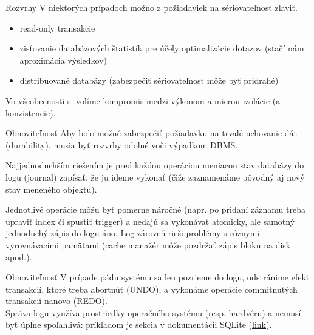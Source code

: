 \documentclass[12pt]{beamer}
\begin{document}
\begin{frame}[fragile]{Rozvrhy}
V niektorých prípadoch možno z požiadaviek na sériovateľnosť zľaviť.
\begin{itemize}
\item read-only transakcie
\item zisťovanie databázových štatistík pre účely optimalizácie dotazov (stačí nám aproximácia výsledkov)
\item distribuované databázy (zabezpečiť sériovateľnosť môže byť pridrahé)
\end{itemize}
Vo všeobecnosti si volíme kompromis medzi výkonom a mierou izolácie (a konzistencie).
\end{frame}


\begin{frame}[fragile]{Obnoviteľnosť}
Aby bolo možné zabezpečiť požiadavku na trvalé uchovanie dát (durability), musia byť rozvrhy odolné voči výpadkom DBMS.

Najjednoduchším riešením je pred každou operáciou meniacou stav databázy do logu (journal) zapísať,
že ju ideme vykonať (čiže zaznamenáme pôvodný aj nový stav meneného objektu).

Jednotlivé operácie môžu byť pomerne náročné (napr. po pridaní záznamu treba upraviť index či spustiť trigger)
a nedajú sa vykonávať atomicky, ale samotný jednoduchý zápis do logu áno.
Log zároveň rieši problémy s rôznymi vyrovnávacími pamäťami (cache manažér môže pozdržať zápis bloku na disk apod.).
\end{frame}


\begin{frame}[fragile]{Obnoviteľnosť}
V prípade pádu systému sa len pozrieme do logu,
odstránime efekt transakcií, ktoré treba abortnúť (UNDO), a vykonáme operácie commitnutých transakcií nanovo (REDO).
\\[3mm]

Správa logu využíva prostriedky operačného systému (resp. hardvéru) a nemusí byť úplne spoľahlivá: príkladom je sekcia
 v dokumentácii SQLite
(\href{https://www.sqlite.org/lockingv3.html#rollback}{link}).
\end{frame}
\end{document}

